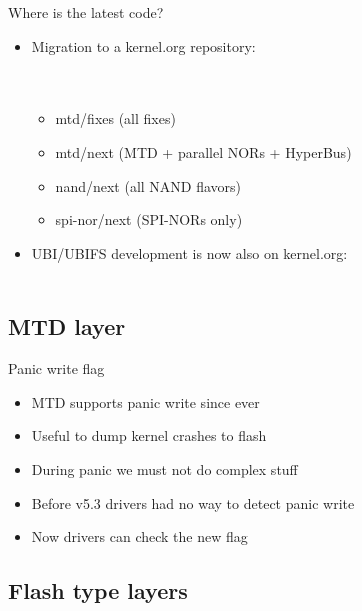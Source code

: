 \documentclass[aspectratio=169,obeyspaces,spaces,hyphens,dvipsnames]{beamer}
\begin{document}
\begin{frame}{Where is the latest code?}
  \begin{itemize}
  \item Migration to a kernel.org repository:\\
    \sout{}\\
    \\
    \begin{itemize}
    \item mtd/fixes (all fixes)
    \item mtd/next (MTD + parallel NORs + HyperBus)
    \item nand/next (all NAND flavors)
    \item spi-nor/next (SPI-NORs only)
    \end{itemize}
    \vfill
  \item UBI/UBIFS development is now also on kernel.org:\\
    \\
  \end{itemize}
\end{frame}

\subsection{MTD layer}

\begin{frame}{Panic write flag}
  \begin{itemize}
  \item MTD supports panic write since ever
  \item Useful to dump kernel crashes to flash
  \item During panic we must not do complex stuff
  \item Before v5.3 drivers had no way to detect panic write
  \item Now drivers can check the new  flag
  \end{itemize}
\end{frame}

\subsection{Flash type layers}
\end{document}

